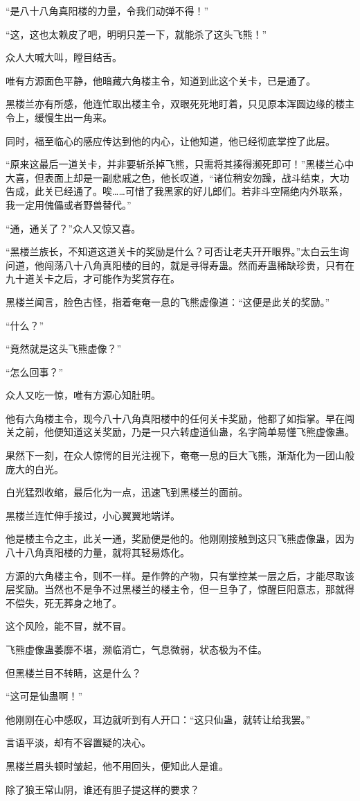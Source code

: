\begin{this_body}
“是八十八角真阳楼的力量，令我们动弹不得！”

“这，这也太赖皮了吧，明明只差一下，就能杀了这头飞熊！”

众人大喊大叫，瞠目结舌。

唯有方源面色平静，他暗藏六角楼主令，知道到此这个关卡，已是通了。

黑楼兰亦有所感，他连忙取出楼主令，双眼死死地盯着，只见原本浑圆边缘的楼主令上，缓慢生出一角来。

同时，福至临心的感应传达到他的内心，让他知道，他已经彻底掌控了此层。

“原来这最后一道关卡，并非要斩杀掉飞熊，只需将其揍得濒死即可！”黑楼兰心中大喜，但表面上却是一副悲戚之色，他长叹道，“诸位稍安勿躁，战斗结束，大功告成，此关已经通了。唉……可惜了我黑家的好儿郎们。若非斗空隔绝内外联系，我一定用傀儡或者野兽替代。”

“通，通关了？”众人又惊又喜。

“黑楼兰族长，不知道这道关卡的奖励是什么？可否让老夫开开眼界。”太白云生询问道，他闯荡八十八角真阳楼的目的，就是寻得寿蛊。然而寿蛊稀缺珍贵，只有在九十道关卡之后，才可能作为奖赏存在。

黑楼兰闻言，脸色古怪，指着奄奄一息的飞熊虚像道：“这便是此关的奖励。”

“什么？”

“竟然就是这头飞熊虚像？”

“怎么回事？”

众人又吃一惊，唯有方源心知肚明。

他有六角楼主令，现今八十八角真阳楼中的任何关卡奖励，他都了如指掌。早在闯关之前，他便知道这关奖励，乃是一只六转虚道仙蛊，名字简单易懂飞熊虚像蛊。

果然下一刻，在众人惊愕的目光注视下，奄奄一息的巨大飞熊，渐渐化为一团山般庞大的白光。

白光猛烈收缩，最后化为一点，迅速飞到黑楼兰的面前。

黑楼兰连忙伸手接过，小心翼翼地端详。

他是楼主令之主，此关一通，奖励便是他的。他刚刚接触到这只飞熊虚像蛊，因为八十八角真阳楼的力量，就将其轻易炼化。

方源的六角楼主令，则不一样。是作弊的产物，只有掌控某一层之后，才能尽取该层奖励。当然也不是争不过黑楼兰的楼主令，但一旦争了，惊醒巨阳意志，那就得不偿失，死无葬身之地了。

这个风险，能不冒，就不冒。

飞熊虚像蛊萎靡不堪，濒临消亡，气息微弱，状态极为不佳。

但黑楼兰目不转睛，这是什么？

“这可是仙蛊啊！”

他刚刚在心中感叹，耳边就听到有人开口：“这只仙蛊，就转让给我罢。”

言语平淡，却有不容置疑的决心。

黑楼兰眉头顿时皱起，他不用回头，便知此人是谁。

除了狼王常山阴，谁还有胆子提这样的要求？

\end{this_body}


